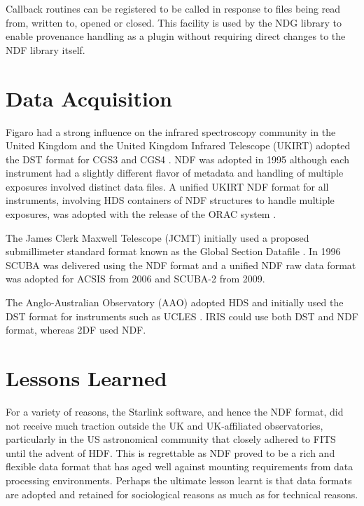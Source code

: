 \documentclass[final,authoryear,5p,times,twocolumn]{elsarticle}
\begin{document}
Callback routines can be registered to be called in response to files
being read from, written to, opened or closed. This facility is used
by the NDG library \citep{SUN2} to enable provenance handling
as a plugin without requiring direct changes to the NDF library itself.

\section{Data Acquisition}
\label{sec:daq}

Figaro had a strong influence on the infrared spectroscopy community
in the United Kingdom and the United Kingdom Infrared Telescope
(UKIRT) adopted the DST format for CGS3 and CGS4 \citep{1993SPIE.1946..547W}. NDF was adopted in
1995 although each instrument had a slightly different flavor of
metadata and handling of multiple exposures involved distinct data
files. A unified UKIRT NDF format for all instruments, involving HDS
containers of NDF structures to handle multiple exposures, was
adopted with the release of the ORAC system \citep{2000SPIE.4009..227B}.

The James Clerk Maxwell Telescope (JCMT) initially used a proposed
submillimeter standard format known as the Global Section Datafile
\citep[GSD;][formerly General Single Dish Data]{sun229}. In 1996 SCUBA
\citep{1999MNRAS.303..659H} was delivered using the NDF format and a
unified NDF raw data format was adopted for ACSIS
\citep{2009MNRAS.399.1026B} from 2006 and SCUBA-2
\citep{2013MNRAS.430.2513H} from 2009.

The Anglo-Australian Observatory (AAO) adopted HDS and initially used
the DST format for instruments such as UCLES
\citep{1990SPIE.1235..562D}. IRIS \citep{1993PASAu..10..298A} could
use both DST and NDF format, whereas 2DF \citep{2002MNRAS.333..279L}
used NDF.

\section{Lessons Learned}
\label{sec:lessons}

For a variety of reasons, the Starlink software, and hence the NDF
format, did not receive much traction outside the UK and UK-affiliated
observatories, particularly in
the US astronomical community that closely adhered to FITS until the
advent of HDF. This is regrettable as NDF proved to be a rich and
flexible data format that has aged well against mounting requirements
from data processing environments. Perhaps the ultimate lesson learnt
is that data formats are adopted and retained for sociological reasons
as much as for technical reasons.
\end{document}
